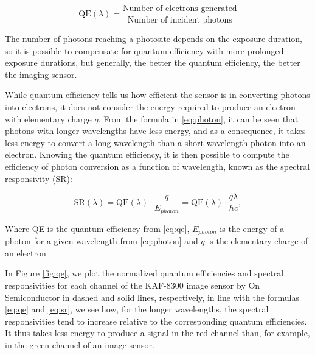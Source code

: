 \begin{equation}
\label{eq:qe}
\text{QE}(\lambda) = \frac{\text{Number of electrons generated}}{\text{Number of incident photons}}
\end{equation}

The number of photons reaching a photosite depends on the exposure duration, so it is possible to compensate for quantum efficiency with more prolonged exposure durations, but generally, the better the quantum efficiency, the better the imaging sensor.

While quantum efficiency tells us how efficient the sensor is in converting photons into electrons, it does not consider the energy required to produce an electron with elementary charge $q$. From the formula in \ref{eq:photon}, it can be seen that photons with longer wavelengths have less energy, and as a consequence, it takes less energy to convert a long wavelength than a short wavelength photon into an electron. Knowing the quantum efficiency, it is then possible to compute the efficiency of photon conversion as a function of wavelength, known as the spectral responsivity (SR): 

\begin{equation}
\label{eq:sr}
\text{SR}(\lambda) =\text{QE}(\lambda) \cdot \frac{q}{E_{photon}} = \text{QE}(\lambda) \cdot \frac{q\lambda}{hc},
\end{equation}

Where QE is the quantum efficiency from \ref{eq:qe}, $E_{photon}$ is the energy of a photon for a given wavelength from \ref{eq:photon} and $q$ is the elementary charge of an electron \cite[78-79]{nakamura}.

In Figure  \ref{fig:qe}, we plot the normalized quantum efficiencies and spectral responsivities for each channel of the KAF-8300 image sensor by On Semiconductor in dashed and solid lines, respectively, in line with the formulas \ref{eq:qe} and \ref{eq:sr}, we see how, for the longer wavelengths, the spectral responsivities tend to increase relative to the corresponding quantum efficiencies. It thus takes less energy to produce a signal in the red channel than, for example, in the green channel of an image sensor.

